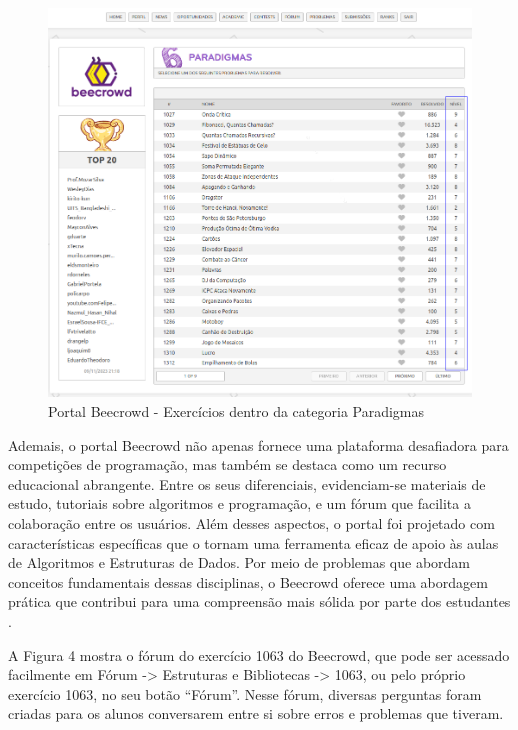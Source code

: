 \begin{figure}[h!]
	   \centering
            \caption{Portal Beecrowd - Exercícios dentro da categoria Paradigmas}
            \label{fig:ModeloConceitual}
	   	\includegraphics[scale=0.3]{pictures/beecrowd_paradigmas.png}
\end{figure}

Ademais, o portal Beecrowd não apenas fornece uma plataforma desafiadora para competições de programação, mas também se destaca como um recurso educacional abrangente. Entre os seus diferenciais, evidenciam-se materiais de estudo, tutoriais sobre algoritmos e programação, e um fórum que facilita a colaboração entre os usuários. Além desses aspectos, o portal foi projetado com características específicas que o tornam uma ferramenta eficaz de apoio às aulas de Algoritmos e Estruturas de Dados. Por meio de problemas que abordam conceitos fundamentais dessas disciplinas, o Beecrowd oferece uma abordagem prática que contribui para uma compreensão mais sólida por parte dos estudantes \cite[p.~2]{beztonin2012}. 

A Figura 4 mostra o fórum do exercício 1063 do Beecrowd, que pode ser acessado facilmente em Fórum -> Estruturas e Bibliotecas -> 1063, ou pelo próprio exercício 1063, no seu botão “Fórum”. Nesse fórum, diversas perguntas foram criadas para os alunos conversarem entre si sobre erros e problemas que tiveram.

